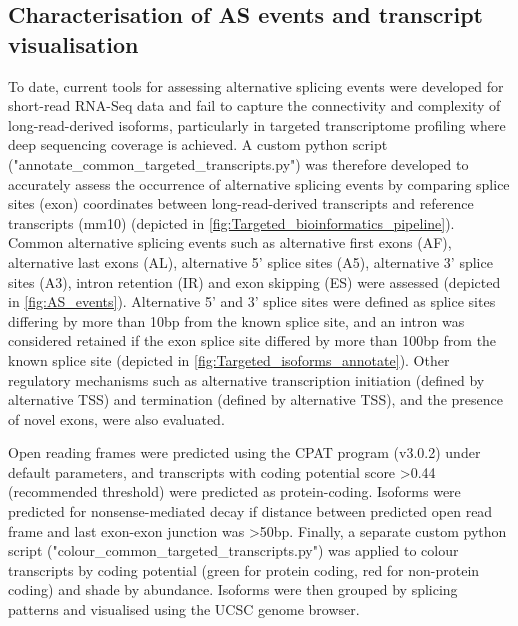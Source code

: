 \newpage
\subsection{Characterisation of AS events and transcript visualisation}
\label{ch6: methods_characterisation}
To date, current tools for assessing alternative splicing events were developed for short-read RNA-Seq data and fail to capture the connectivity and complexity of long-read-derived isoforms, particularly in targeted transcriptome profiling where deep sequencing coverage is achieved. A custom python script ("annotate\_common\_targeted\_transcripts.py") was therefore developed to accurately assess the occurrence of alternative splicing events by comparing splice sites (exon) coordinates between long-read-derived transcripts and reference transcripts (mm10) (depicted in \cref{fig:Targeted_bioinformatics_pipeline}). Common alternative splicing events such as alternative first exons (AF), alternative last exons (AL), alternative 5' splice sites (A5), alternative 3' splice sites (A3), intron retention (IR) and exon skipping (ES) were assessed (depicted in \cref{fig:AS_events}). Alternative 5' and 3' splice sites were defined as splice sites differing by more than 10bp from the known splice site, and an intron was considered retained if the exon splice site differed by more than 100bp from the known splice site (depicted in \cref{fig:Targeted_isoforms_annotate}). Other regulatory mechanisms such as alternative transcription initiation (defined by alternative TSS) and termination (defined by alternative TSS), and the presence of novel exons, were also evaluated. 

Open reading frames were predicted using the CPAT program (v3.0.2) under default parameters, and transcripts with coding potential score >0.44 (recommended threshold) were predicted as protein-coding. Isoforms were predicted for nonsense-mediated decay if distance between predicted open read frame and last exon-exon junction was >50bp. Finally, a separate custom python script ("colour\_common\_targeted\_transcripts.py") was applied to colour transcripts by coding potential (green for protein coding, red for non-protein coding) and shade by abundance. Isoforms were then grouped by splicing patterns and visualised using the UCSC genome browser. 


